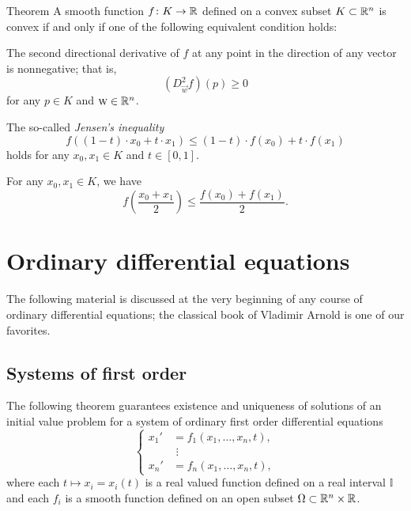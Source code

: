 \begin{thm}{Theorem}
A smooth function $f\colon K\to \mathbb{R}$ defined on a convex subset $K\subset\mathbb{R}^n$ is convex if and only if one of the following equivalent condition holds:

\begin{subthm}{}
The second directional derivative of $f$ at any point in the direction of any vector is nonnegative; that is,
\[(D_{\vec w}^2f)(p)\ge 0\]
for any $p\in K$ and $\text{\sc{w}}\in\mathbb{R}^n$.
\end{subthm}

\begin{subthm}{}
The so-called \emph{Jensen's inequality}
\[f \left ((1-t)\cdot x_0 + t\cdot x_1 \right ) \le (1-t)\cdot f(x_0)+ t\cdot f(x_1)\]
holds for any $x_0,x_1\in K$ and $t\in[0,1]$.

\end{subthm}

\begin{subthm}{}
For any $x_0,x_1\in K$, we have 
\[f \left (\frac{x_0 + x_1}2 \right ) \le \frac{f(x_0) + f(x_1)}2.\]
\end{subthm}

\end{thm}




\section{Ordinary differential equations}

The following material is discussed at the very beginning of any course of ordinary differential equations; the classical book of Vladimir Arnold \cite{arnold} is one of our favorites.


\subsection*{Systems of first order}

The following theorem guarantees existence and uniqueness of solutions of an initial value problem
for a system of ordinary first order differential equations
\[
\begin{cases}
x_1'&=f_1(x_1,\dots,x_n,t),
\\
&\,\,\vdots
\\
x_n'&=f_n(x_1,\dots,x_n,t),
\end{cases}
\]
where each $t\mapsto x_i=x_i(t)$ is a real valued function defined on a real interval $\mathbb{I}$
and each $f_i$ is a smooth function defined on an open subset $\Omega\subset \mathbb{R}^n\times \mathbb{R}$.

